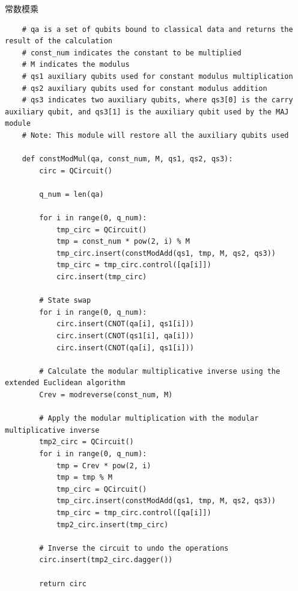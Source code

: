 \documentclass[12pt,hyperref,a4paper,UTF8]{ctexart}
\begin{document}
常数模乘
\begin{lstlisting}
    # qa is a set of qubits bound to classical data and returns the result of the calculation
    # const_num indicates the constant to be multiplied
    # M indicates the modulus
    # qs1 auxiliary qubits used for constant modulus multiplication
    # qs2 auxiliary qubits used for constant modulus addition
    # qs3 indicates two auxiliary qubits, where qs3[0] is the carry auxiliary qubit, and qs3[1] is the auxiliary qubit used by the MAJ module
    # Note: This module will restore all the auxiliary qubits used

    def constModMul(qa, const_num, M, qs1, qs2, qs3):
        circ = QCircuit()

        q_num = len(qa)

        for i in range(0, q_num):
            tmp_circ = QCircuit()
            tmp = const_num * pow(2, i) % M
            tmp_circ.insert(constModAdd(qs1, tmp, M, qs2, qs3))
            tmp_circ = tmp_circ.control([qa[i]])
            circ.insert(tmp_circ)

        # State swap
        for i in range(0, q_num):
            circ.insert(CNOT(qa[i], qs1[i]))
            circ.insert(CNOT(qs1[i], qa[i]))
            circ.insert(CNOT(qa[i], qs1[i]))

        # Calculate the modular multiplicative inverse using the extended Euclidean algorithm
        Crev = modreverse(const_num, M)

        # Apply the modular multiplication with the modular multiplicative inverse
        tmp2_circ = QCircuit()
        for i in range(0, q_num):
            tmp = Crev * pow(2, i)
            tmp = tmp % M
            tmp_circ = QCircuit()
            tmp_circ.insert(constModAdd(qs1, tmp, M, qs2, qs3))
            tmp_circ = tmp_circ.control([qa[i]])
            tmp2_circ.insert(tmp_circ)

        # Inverse the circuit to undo the operations
        circ.insert(tmp2_circ.dagger())

        return circ
\end{lstlisting}
\end{document}
